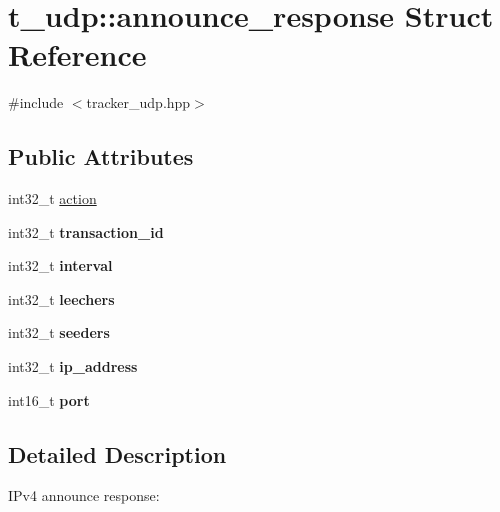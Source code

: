 \hypertarget{structt__udp_1_1announce__response}{}\section{t\+\_\+udp\+:\+:announce\+\_\+response Struct Reference}
\label{structt__udp_1_1announce__response}


{\ttfamily \#include $<$tracker\+\_\+udp.\+hpp$>$}

\subsection*{Public Attributes}
\begin{DoxyCompactItemize}
\item 
int32\+\_\+t \hyperlink{structt__udp_1_1announce__response_a80aeacfd03e3e64be4218782c6f9b806}{action}
\item 
\mbox{\label{structt__udp_1_1announce__response_a09d988c7f1c6c46bc37410438d073f45}} 
int32\+\_\+t {\bfseries transaction\+\_\+id}
\item 
\mbox{\label{structt__udp_1_1announce__response_afadf951fbddae38de06ba177c2d595b4}} 
int32\+\_\+t {\bfseries interval}
\item 
\mbox{\label{structt__udp_1_1announce__response_a384b9f0c2c7d8f90a3704bf7257bba6a}} 
int32\+\_\+t {\bfseries leechers}
\item 
\mbox{\label{structt__udp_1_1announce__response_ad6e3f8e872113765e01062f0b4789713}} 
int32\+\_\+t {\bfseries seeders}
\item 
\mbox{\label{structt__udp_1_1announce__response_a7833ebaa72ad05ee3ee78338b0ea39f1}} 
int32\+\_\+t {\bfseries ip\+\_\+address}
\item 
\mbox{\label{structt__udp_1_1announce__response_aa2102c671b5d2a2455cf1d97a70886b7}} 
int16\+\_\+t {\bfseries port}
\end{DoxyCompactItemize}


\subsection{Detailed Description}
I\+Pv4 announce response\+:

